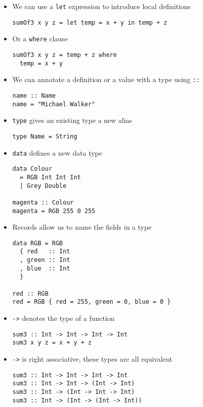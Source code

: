 \begin{itemize}
\item We can use a \verb|let| expression to introduce local definitions
\begin{verbatim}
sumOf3 x y z = let temp = x + y in temp + z
\end{verbatim}

\item Or a \verb|where| clause
\begin{verbatim}
sumOf3 x y z = temp + z where
  temp = x + y
\end{verbatim}

\item We can annotate a definition or a value with a type using \verb|::|
\begin{verbatim}
name :: Name
name = "Michael Walker"
\end{verbatim}

\item \verb|type| gives an existing type a new alias
\begin{verbatim}
type Name = String
\end{verbatim}

\item \verb|data| defines a new data type
\begin{verbatim}
data Colour
  = RGB Int Int Int
  | Grey Double

magenta :: Colour
magenta = RGB 255 0 255
\end{verbatim}

\item Records allow us to name the fields in a type
\begin{verbatim}
data RGB = RGB
  { red   :: Int
  , green :: Int
  , blue  :: Int
  }

red :: RGB
red = RGB { red = 255, green = 0, blue = 0 }
\end{verbatim}

\item \verb|->| denotes the type of a function
\begin{verbatim}
sum3 :: Int -> Int -> Int -> Int
sum3 x y z = x + y + z
\end{verbatim}

\item \verb|->| is right associative, these types are all equivalent
\begin{verbatim}
sum3 :: Int -> Int -> Int -> Int
sum3 :: Int -> Int -> (Int -> Int)
sum3 :: Int -> (Int -> Int -> Int)
sum3 :: Int -> (Int -> (Int -> Int))
\end{verbatim}


\end{itemize}
